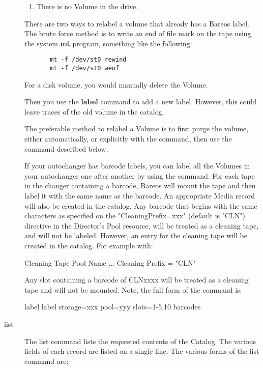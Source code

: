 \begin{description}
\begin{enumerate}
\item There is no Volume in the drive.
\end{enumerate}

There are two ways to relabel a volume that already has a Bareos label. The
brute  force method is to write an end of file mark on the tape  using the
system {\bf mt} program, something like the  following:

\footnotesize
\begin{verbatim}
       mt -f /dev/st0 rewind
       mt -f /dev/st0 weof
\end{verbatim}
\normalsize

For a disk volume, you would manually delete the Volume.

Then you use the {\bf label} command to add a new label.  However, this could
leave traces of the old volume in the  catalog.

The preferable method to relabel a Volume is to first purge the volume,
either automatically, or explicitly with the   command,
then use the  command described  below.

If your autochanger has barcode labels, you can label all the Volumes in
your autochanger one after another by using the 
command.  For each tape in the changer containing a barcode, Bareos will
mount the tape and then label it with the same name as the barcode.  An
appropriate Media record will also be created in the catalog.  Any barcode
that begins with the same characters as specified on the
"CleaningPrefix=xxx" (default is "CLN") directive in the Director's Pool resource, will be
treated as a cleaning tape, and will not be labeled.  However, an entry for
the cleaning tape will be created in the catalog.  For example with:

\begin{bconfig}{Cleaning Tape}
Pool {
    Name ...
    Cleaning Prefix = "CLN"
}
\end{bconfig}

Any slot containing a barcode of CLNxxxx will be treated as a cleaning tape
and will not be mounted.  Note, the full form of the command is:

\begin{bconsole}{label}
label storage=xxx pool=yyy slots=1-5,10 barcodes
\end{bconsole}

\item [list]
   The list command lists the requested contents of the Catalog.  The
   various fields of each record are listed on a single line.  The various
   forms of the list command are:


\end{description}
